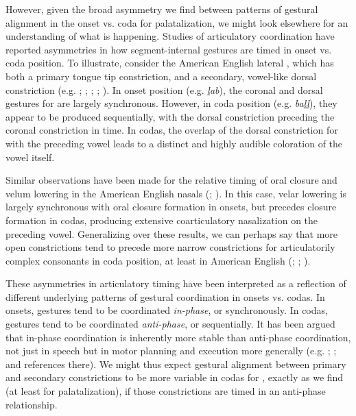 \documentclass[output=paper,colorlinks,citecolor=brown]{langscibook}
\newcommand{\pal}{\ipa{ʲ}}
\newcommand{\vel}{\ipa{ˠ}}
\begin{document}
However, given the broad asymmetry we find between patterns of gestural alignment in the onset vs. coda for palatalization, we might look elsewhere for an understanding of what is happening. Studies of articulatory coordination have reported asymmetries in how segment-internal gestures are timed in onset vs. coda position. To illustrate, consider the American English lateral , which has both a primary tongue tip constriction, and a secondary, vowel-like dorsal constriction (e.g. \cite{Krakow1999_physiological_syllables}; \cite{Sproat_Fujimura1993_l-allophony}; \cite{Proctor2009_liquids}; \cite{Lee_etal2013_Eng_l_darkening_morphology}; \cite{Turton2017_l_darkening}). In onset position (e.g. \emph{\uline{l}ab}), the coronal and dorsal gestures for  are largely synchronous. However, in coda position (e.g. \emph{ba\uline{ll}}), they appear to be produced sequentially, with the dorsal constriction preceding the coronal constriction in time. In codas, the overlap of the dorsal constriction for  with the preceding vowel leads to a distinct and highly audible coloration of the vowel itself.

Similar observations have been made for the relative timing of oral closure and velum lowering in the American English nasals  (\cite{Krakow1999_physiological_syllables}; \cite{Byrd_etal2009_nasal_timing}). In this case, velar lowering is largely synchronous with oral closure formation in onsets, but precedes closure formation in codas, producing extensive coarticulatory nasalization on the preceding vowel. Generalizing over these results, we can perhaps say that more open constrictions tend to precede more narrow constrictions for articulatorily complex consonants in coda position, at least in American English (\cite{Krakow1999_physiological_syllables}; \cite{Sproat_Fujimura1993_l-allophony}; \cite{Iskarous_Kavitskaya2010_phonetic_variability}).

These asymmetries in articulatory timing have been interpreted as a reflection of different underlying patterns of gestural coordination in onsets vs. codas. In onsets, gestures tend to be coordinated \emph{in-phase}, or synchronously. In codas, gestures tend to be coordinated \emph{anti-phase}, or sequentially. It has been argued that in-phase coordination is inherently more stable than anti-phase coordination, not just in speech but in motor planning and execution more generally (e.g. \cite{Goldstein_etal2006_gesture_phono_evolution}; \cite{Nam_etal2009_syll_coupled_oscil}; \cite{Parrell2012_gestures_Spanish_aspiration} and references there). We might thus expect gestural alignment between primary and secondary constrictions to be more variable in codas for \ipa{/C\pal\ C\vel/}, exactly as we find (at least for palatalization), if those constrictions are timed in an anti-phase relationship.
\end{document}

